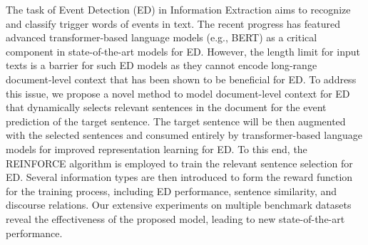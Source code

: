 The task of Event Detection (ED) in Information Extraction aims to recognize and classify trigger words of events in text. The recent progress has featured advanced transformer-based language models (e.g., BERT) as a critical component in state-of-the-art models for ED. However, the length limit for input texts is a barrier for such ED models as they cannot encode long-range document-level context that has been shown to be beneficial for ED. To address this issue, we propose a novel method to model document-level context for ED that dynamically selects relevant sentences in the document for the event prediction of the target sentence. The target sentence will be then augmented with the selected sentences and consumed entirely by transformer-based language models for improved representation learning for ED. To this end, the REINFORCE algorithm is employed to train the relevant sentence selection for ED. Several information types are then introduced to form the reward function for the training process, including ED performance, sentence similarity, and discourse relations. Our extensive experiments on multiple benchmark datasets reveal the effectiveness of the proposed model, leading to new state-of-the-art performance.
